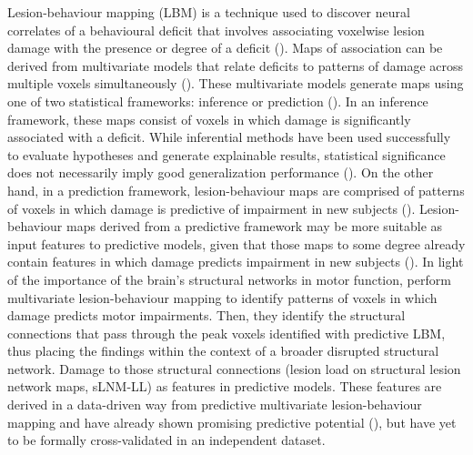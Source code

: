 \documentclass[phd,tocprelim]{cornell}
\begin{document}
Lesion-behaviour mapping (LBM) is a technique used to discover neural correlates of a behavioural deficit that involves associating voxelwise lesion damage with the presence or degree of a deficit (\cite{Bates2003-eg,Karnath2020-cg}). Maps of association can be derived from multivariate models that relate deficits to patterns of damage across multiple voxels simultaneously (\cite{Ivanova2021-nh, Karnath2020-cg, Zhang2014-jd, Sperber2019-tu}). These multivariate models generate maps using one of two statistical frameworks: inference or prediction (\cite{Sperber2022-oj, Bzdok2020-py}). In an inference framework, these maps consist of voxels in which damage is significantly associated with a deficit. While inferential methods have been used successfully to evaluate hypotheses and generate explainable results, statistical significance does not necessarily imply good generalization performance (\cite{Bzdok2020-py}). On the other hand, in a prediction framework, lesion-behaviour maps are comprised of patterns of voxels in which damage is predictive of impairment in new subjects (\cite{Bowren2022-rs, Mah2014-cb,Rondina2017-ij, Sperber2020-kp}). Lesion-behaviour maps derived from a predictive framework may be more suitable as input features to predictive models, given that those maps to some degree already contain features in which damage predicts impairment in new subjects (\cite{Zhang2014-jd}). In light of the importance of the brain's structural networks in motor function, \cite{Bowren2022-rs} perform multivariate lesion-behaviour mapping to identify patterns of voxels in which damage predicts motor impairments. Then, they identify the structural connections that pass through the peak voxels identified with predictive LBM, thus placing the findings within the context of a broader disrupted structural network. Damage to those structural connections (lesion load on structural lesion network maps, sLNM-LL) as features in predictive models. These features are derived in a data-driven way from predictive multivariate lesion-behaviour mapping and have already shown promising predictive potential (\cite{Bowren2022-rs}), but have yet to be formally cross-validated in an independent dataset. 
\end{document}
